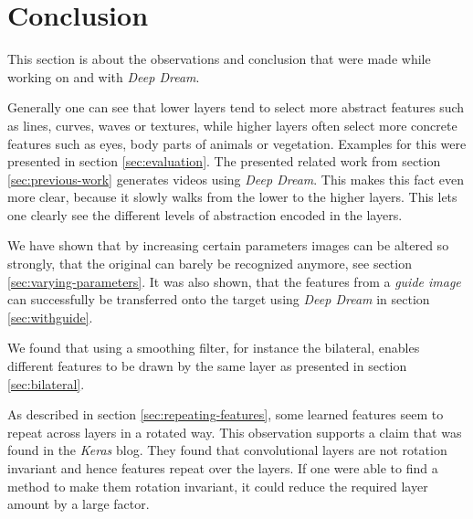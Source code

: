 \section{Conclusion}
\label{sec:conclusion}
This section is about the observations and conclusion that were made while working on and with \textit{Deep Dream}.

Generally one can see that lower layers tend to select more abstract features such as lines, curves, waves or textures, while higher layers often select more concrete features such as eyes, body parts of animals or vegetation.
Examples for this were presented in section \ref{sec:evaluation}.
The presented related work from section \ref{sec:previous-work} generates videos using \textit{Deep Dream}.
This makes this fact even more clear, because it slowly walks from the lower to the higher layers.
This lets one clearly see the different levels of abstraction encoded in the layers.

We have shown that by increasing certain parameters images can be altered so strongly, that the original can barely be recognized anymore, see section \ref{sec:varying-parameters}.
It was also shown, that the features from a \emph{guide image} can successfully be transferred onto the target using \textit{Deep Dream} in section \ref{sec:withguide}.

We found that using a smoothing filter, for instance the bilateral, enables different features to be drawn by the same layer as presented in section \ref{sec:bilateral}.

As described in section \ref{sec:repeating-features}, some learned features seem to repeat across layers in a rotated way.
This observation supports a claim that was found in the \textit{Keras} blog.\cite{keras-blog}
They found that convolutional layers are not rotation invariant and hence features repeat over the layers.
If one were able to find a method to make them rotation invariant, it could reduce the required layer amount by a large factor.

